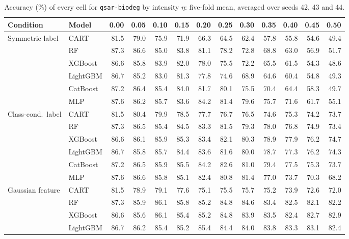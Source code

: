 \documentclass[pdflatex,sn-mathphys]{sn-jnl}
\theoremstyle{thmstyleone}
\begin{document}
\begin{table}[htbp]
\centering
\tiny
\setlength{\tabcolsep}{2.6pt}
\caption{Accuracy (\%) of every cell for \texttt{qsar-biodeg} by intensity $\eta$: five-fold mean, averaged over seeds 42, 43 and 44.}
\label{tab:grid_qsar_biodeg}
\begin{tabular}{@{}llrrrrrrrrrrr@{}}
\toprule
Condition & Model & 0.00 & 0.05 & 0.10 & 0.15 & 0.20 & 0.25 & 0.30 & 0.35 & 0.40 & 0.45 & 0.50 \\
\midrule
Symmetric label & CART & 81.5 & 79.0 & 75.9 & 71.9 & 66.3 & 64.5 & 62.4 & 57.8 & 55.8 & 54.6 & 49.4 \\
 & RF & 87.3 & 86.6 & 85.0 & 83.8 & 81.1 & 78.2 & 72.8 & 68.8 & 63.0 & 56.9 & 51.7 \\
 & XGBoost & 86.6 & 85.8 & 83.9 & 82.0 & 78.0 & 75.5 & 72.2 & 65.5 & 61.5 & 54.3 & 48.6 \\
 & LightGBM & 86.7 & 85.2 & 83.0 & 81.3 & 77.8 & 74.6 & 68.9 & 64.6 & 60.4 & 54.8 & 49.3 \\
 & CatBoost & 87.2 & 86.4 & 85.4 & 84.0 & 81.7 & 80.1 & 75.5 & 70.4 & 64.4 & 58.3 & 49.7 \\
 & MLP & 87.6 & 86.2 & 85.7 & 83.6 & 84.2 & 81.4 & 79.6 & 75.7 & 71.6 & 61.7 & 55.1 \\
\midrule
Class-cond.\ label & CART & 81.5 & 80.4 & 79.9 & 78.5 & 77.7 & 76.7 & 76.5 & 74.6 & 75.3 & 74.2 & 73.7 \\
 & RF & 87.3 & 86.5 & 85.4 & 84.5 & 83.3 & 81.5 & 79.3 & 78.0 & 76.8 & 74.9 & 73.4 \\
 & XGBoost & 86.6 & 86.1 & 85.9 & 85.3 & 83.4 & 82.1 & 80.3 & 78.9 & 77.9 & 76.2 & 74.7 \\
 & LightGBM & 86.7 & 85.8 & 85.7 & 84.4 & 83.6 & 81.6 & 80.0 & 78.7 & 77.3 & 76.2 & 74.3 \\
 & CatBoost & 87.2 & 86.5 & 85.9 & 85.5 & 84.2 & 82.6 & 81.0 & 79.4 & 77.5 & 75.3 & 73.7 \\
 & MLP & 87.6 & 86.6 & 85.8 & 85.1 & 82.4 & 80.8 & 81.4 & 77.0 & 73.7 & 70.3 & 68.2 \\
\midrule
Gaussian feature & CART & 81.5 & 78.9 & 79.1 & 77.6 & 75.1 & 75.5 & 75.7 & 75.2 & 73.9 & 72.6 & 72.0 \\
 & RF & 87.3 & 85.9 & 86.1 & 85.8 & 85.2 & 84.8 & 84.6 & 83.4 & 82.5 & 82.1 & 82.2 \\
 & XGBoost & 86.6 & 85.6 & 86.1 & 85.4 & 85.2 & 84.8 & 83.9 & 83.5 & 82.4 & 82.7 & 82.9 \\
 & LightGBM & 86.7 & 86.2 & 85.4 & 85.2 & 85.4 & 84.4 & 84.0 & 83.8 & 83.3 & 83.1 & 82.4 \\

\end{tabular}
\end{table}
\end{document}
